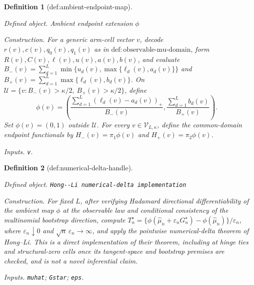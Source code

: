 \documentclass{article}
\newtheorem{definition}{Definition}
\begin{document}
\begin{definition}[def:ambient-endpoint-map]\label{def:ambient-endpoint-map}
\par\smallskip\noindent\emph{Defined object.} Ambient endpoint extension \(\phi\)
\par\smallskip\noindent\emph{Construction.} For a generic arm-cell vector \(v\), decode \(r(v),c(v),q_0(v),q_1(v)\) as in \(\mathrm{def{:}observable\mbox{-}mu\mbox{-}domain}\), form \(R(v),C(v),\ell(v),u(v),a(v),b(v)\), and evaluate \(B_-(v)=\sum_{d=1}^{L}\min\{u_d(v),\max\{\ell_d(v),a_d(v)\}\}\) and \(B_+(v)=\sum_{d=1}^{L}\max\{\ell_d(v),b_d(v)\}\). On \(\mathcal U=\{v:B_-(v)>\kappa/2,\ B_+(v)>\kappa/2\}\), define \[\phi(v)=\left(\frac{\sum_{d=1}^{L}(\ell_d(v)-a_d(v))_+}{B_-(v)},\frac{\sum_{d=1}^{L}b_d(v)}{B_+(v)}\right).\] Set \(\phi(v)=(0,1)\) outside \(\mathcal U\). For every \(v\in\mathcal V_{L,\kappa}\), define the common-domain endpoint functionals by \(H_-(v)=\pi_1\phi(v)\) and \(H_+(v)=\pi_2\phi(v)\).
\par\smallskip\noindent\emph{Inputs.} \texttt{v}.
\end{definition}

\begin{definition}[def:numerical-delta-handle]\label{def:numerical-delta-handle}
\par\smallskip\noindent\emph{Defined object.} \texttt{Hong-\allowbreak{}-\allowbreak{}Li numerical-\allowbreak{}delta implementation}
\par\smallskip\noindent\emph{Construction.} For fixed \(L\), after verifying Hadamard directional differentiability of the ambient map \(\phi\) at the observable law and conditional consistency of the multinomial bootstrap direction, compute \(T_n^{\star}=\{\phi(\widehat\mu_n+\varepsilon_nG_n^{\star})-\phi(\widehat\mu_n)\}/\varepsilon_n\), where \(\varepsilon_n\downarrow0\) and \(\sqrt n\,\varepsilon_n\to\infty\), and apply the pointwise numerical-delta theorem of Hong--Li. This is a direct implementation of their theorem, including at hinge ties and structural-zero cells once its tangent-space and bootstrap premises are checked, and is not a novel inferential claim.
\par\smallskip\noindent\emph{Inputs.} \texttt{muhat}; \texttt{Gstar}; \texttt{eps}.
\end{definition}
\end{document}
